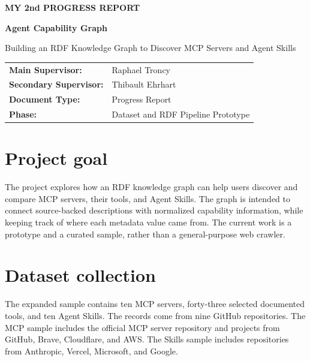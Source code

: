\documentclass[11pt,a4paper]{article}
\begin{document}
\hypersetup{pageanchor=false}
\begin{titlepage}
\centering\vspace*{1.7cm}
{\Large\bfseries MY 2nd PROGRESS REPORT \par}
\vspace{1.2cm}
{\Huge\bfseries\color{bleu} Agent Capability Graph\par}
\vspace{0.5cm}
{\LARGE Building an RDF Knowledge Graph to Discover MCP Servers and Agent Skills\par}
\vspace{1.4cm}
\begin{tabular}{@{}ll@{}}
\textbf{Main Supervisor:} & Raphael Troncy\\
\textbf{Secondary Supervisor:} & Thibault Ehrhart\\
\textbf{Document Type:} & Progress Report\\
\textbf{Phase:} & Dataset and RDF Pipeline Prototype\\
\end{tabular}

\vfill

\vspace{1cm}{\large \today\par}
\end{titlepage}
\hypersetup{pageanchor=true}

\section{Project goal}

The project explores how an RDF knowledge graph can help users discover and
compare MCP servers, their tools, and Agent Skills. The graph is intended to
connect source-backed descriptions with normalized capability information,
while keeping track of where each metadata value came from. The current work is
a prototype and a curated sample, rather than a general-purpose web crawler.

\section{Dataset collection}

The expanded sample contains ten MCP servers, forty-three selected documented
tools, and ten Agent Skills. The records come from nine GitHub repositories.
The MCP sample includes the official MCP server repository and projects from
GitHub, Brave, Cloudflare, and AWS. The Skills sample includes repositories
from Anthropic, Vercel, Microsoft, and Google.
\end{document}

